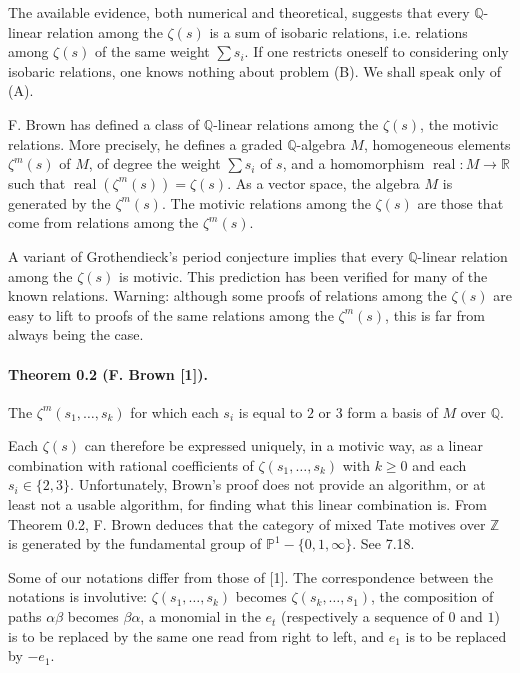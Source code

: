 \documentclass[10pt]{article}
\newcommand{\Q}{\mathbb Q}
\newcommand{\Z}{\mathbb Z}
\newcommand{\R}{\mathbb R}
\newcommand{\PP}{\mathbb P}
\newcommand{\real}{\operatorname{real}}
\begin{document}
The available evidence, both numerical and theoretical, suggests that every $\Q$-linear relation among the $\zeta(s)$ is a sum of isobaric relations, i.e. relations among $\zeta(s)$ of the same weight $\sum s_i$.
If one restricts oneself to considering only isobaric relations, one knows nothing about problem (B).
We shall speak only of (A).

F. Brown has defined a class of $\Q$-linear relations among the $\zeta(s)$, the motivic relations.
More precisely, he defines a graded $\Q$-algebra $M$, homogeneous elements $\zeta^m(s)$ of $M$, of degree the weight $\sum s_i$ of $s$, and a homomorphism $\real:M\to\R$ such that $\real(\zeta^m(s))=\zeta(s)$.
As a vector space, the algebra $M$ is generated by the $\zeta^m(s)$.
The motivic relations among the $\zeta(s)$ are those that come from relations among the $\zeta^m(s)$.

A variant of Grothendieck's period conjecture implies that every $\Q$-linear relation among the $\zeta(s)$ is motivic.
This prediction has been verified for many of the known relations.
Warning: although some proofs of relations among the $\zeta(s)$ are easy to lift to proofs of the same relations among the $\zeta^m(s)$, this is far from always being the case.

\paragraph{Theorem 0.2 (F. Brown [1]).}
The $\zeta^m(s_1,\ldots,s_k)$ for which each $s_i$ is equal to $2$ or $3$ form a basis of $M$ over $\Q$.

Each $\zeta(s)$ can therefore be expressed uniquely, in a motivic way, as a linear combination with rational coefficients of $\zeta(s_1,\ldots,s_k)$ with $k\geq 0$ and each $s_i\in\{2,3\}$.
Unfortunately, Brown's proof does not provide an algorithm, or at least not a usable algorithm, for finding what this linear combination is.
From Theorem 0.2, F. Brown deduces that the category of mixed Tate motives over $\Z$ is generated by the fundamental group of $\PP^1-\{0,1,\infty\}$. See 7.18.

Some of our notations differ from those of [1].
The correspondence between the notations is involutive: $\zeta(s_1,\ldots,s_k)$ becomes $\zeta(s_k,\ldots,s_1)$, the composition of paths $\alpha\beta$ becomes $\beta\alpha$, a monomial in the $e_t$ (respectively a sequence of $0$ and $1$) is to be replaced by the same one read from right to left, and $e_1$ is to be replaced by $-e_1$.
\end{document}
